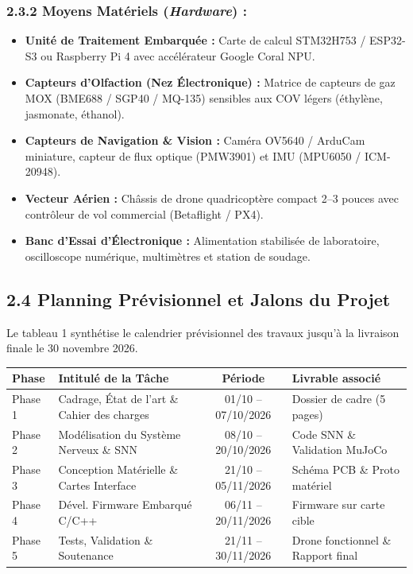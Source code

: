 \documentclass[11pt,a4paper]{article}
\begin{document}
\subsubsection*{\color{darkgray}2.3.2 Moyens Matériels (\textit{Hardware}) :}
\begin{itemize}
    \item \textbf{Unité de Traitement Embarquée :} Carte de calcul STM32H753 / ESP32-S3 ou Raspberry Pi 4 avec accélérateur Google Coral NPU.
    \item \textbf{Capteurs d'Olfaction (Nez Électronique) :} Matrice de capteurs de gaz MOX (BME688 / SGP40 / MQ-135) sensibles aux COV légers (éthylène, jasmonate, éthanol).
    \item \textbf{Capteurs de Navigation \& Vision :} Caméra OV5640 / ArduCam miniature, capteur de flux optique (PMW3901) et IMU (MPU6050 / ICM-20948).
    \item \textbf{Vecteur Aérien :} Châssis de drone quadricoptère compact 2--3 pouces avec contrôleur de vol commercial (Betaflight / PX4).
    \item \textbf{Banc d'Essai d'Électronique :} Alimentation stabilisée de laboratoire, oscilloscope numérique, multimètres et station de soudage.
\end{itemize}

\subsection*{\color{secondarygreen}2.4 Planning Prévisionnel et Jalons du Projet}

Le tableau 1 synthétise le calendrier prévisionnel des travaux jusqu'à la livraison finale le 30 novembre 2026.

\vspace{0.2cm}
\begin{center}
\small
\begin{tabular}{|l|p{6.5cm}|c|p{4cm}|}
\hline
\textbf{Phase} & \textbf{Intitulé de la Tâche} & \textbf{Période} & \textbf{Livrable associé} \\ \hline
Phase 1 & Cadrage, État de l'art \& Cahier des charges & 01/10 -- 07/10/2026 & Dossier de cadre (5 pages) \\ \hline
Phase 2 & Modélisation du Système Nerveux \& SNN & 08/10 -- 20/10/2026 & Code SNN \& Validation MuJoCo \\ \hline
Phase 3 & Conception Matérielle \& Cartes Interface & 21/10 -- 05/11/2026 & Schéma PCB \& Proto matériel \\ \hline
Phase 4 & Dével. Firmware Embarqué C/C++ & 06/11 -- 20/11/2026 & Firmware sur carte cible \\ \hline
Phase 5 & Tests, Validation \& Soutenance & 21/11 -- 30/11/2026 & Drone fonctionnel \& Rapport final \\ \hline
\end{tabular}
\end{center}
\vspace{0.2cm}
\end{document}
